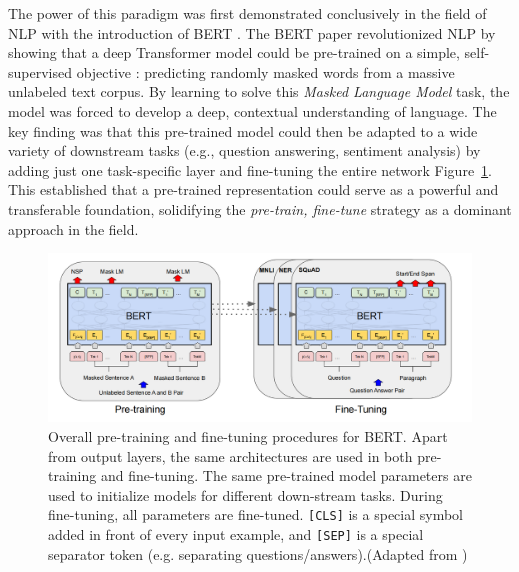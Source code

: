 The power of this paradigm was first demonstrated conclusively in the field of \ac{NLP} with the introduction of \ac{BERT} \parencite{bert_pretraining_deep_bidirectional_transformers_language_understanding}. The \ac{BERT} paper revolutionized NLP by showing that a deep Transformer model could be pre-trained on a simple, self-supervised objective : predicting randomly masked words from a massive unlabeled text corpus. By learning to solve this \textit{Masked Language Model} task, the model was forced to develop a deep, contextual understanding of language. The key finding was that this pre-trained model could then be adapted to a wide variety of downstream tasks (e.g., question answering, sentiment analysis) by adding just one task-specific layer and fine-tuning the entire network Figure~\ref{fig:bert_architecture}. This established that a  pre-trained representation could serve as a powerful and transferable foundation, solidifying the \textit{pre-train, fine-tune}  strategy as a dominant approach in the field.
\begin{figure}[H]
    \centering
   
        
    \includegraphics[width= 0.9\linewidth]{img_pfe/bert.png}
 
  
                \caption{Overall pre-training and fine-tuning procedures for BERT. Apart from output layers, the same architectures are used in both pre-training and fine-tuning. The same pre-trained model parameters are used to initialize models for different down-stream tasks. During fine-tuning, all parameters are fine-tuned. \texttt{[CLS]} is a special
symbol added in front of every input example, and \texttt{[SEP]} is a special separator token (e.g. separating questions/answers).(Adapted from \parencite{bert_pretraining_deep_bidirectional_transformers_language_understanding})}
        \label{fig:bert_architecture}
\end{figure}
